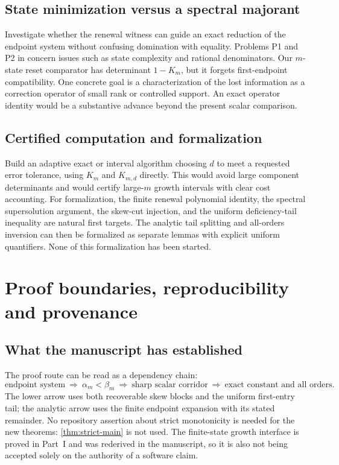 \documentclass[11pt,a4paper]{article}
\theoremstyle{definition}\newaliascnt{definition}{theorem}
\theoremstyle{remark}\newaliascnt{remark}{theorem}
\begin{document}
\subsection{State minimization versus a spectral majorant}
Investigate whether the renewal witness can guide an exact reduction of the
endpoint system without confusing domination with equality. Problems P1 and
P2 in \cite{MayamaAkita} concern issues such as state complexity and
rational denominators. Our $m$-state reset comparator has determinant
$1-K_m$, but it forgets first-endpoint compatibility. One concrete goal is a
characterization of the lost information as a correction operator of small
rank or controlled support. An exact operator identity would be a
substantive advance beyond the present scalar comparison.

\subsection{Certified computation and formalization}
Build an adaptive exact or interval algorithm choosing $d$ to meet a
requested error tolerance, using $K_m$ and $K_{m,d}$ directly. This would
avoid large component determinants and would certify large-$m$ growth
intervals with clear cost accounting. For formalization, the finite renewal
polynomial identity, the spectral supersolution argument, the skew-cut
injection, and the uniform deficiency-tail inequality are natural first
targets. The analytic tail splitting and all-orders inversion can then be
formalized as separate lemmas with explicit uniform quantifiers. None of
this formalization has been started.

\section{Proof boundaries, reproducibility and provenance}
\label{crem:sec:audit}

\subsection{What the manuscript has established}
The proof route can be read as a dependency chain:
\[
 \text{endpoint system}
 \ \Longrightarrow\ \alpha_m<\beta_m
 \ \Longrightarrow\ \text{sharp scalar corridor}
 \ \Longrightarrow\ \text{exact constant and all orders}.
\]
The lower arrow uses both recoverable skew blocks and the uniform
first-entry tail; the analytic arrow uses the finite endpoint expansion with
its stated remainder. No repository assertion about strict monotonicity is
needed for the new theorems: \cref{thm:strict-main} is not used. The
finite-state growth interface is proved in Part~I and was rederived in the
manuscript, so it is also not being accepted solely on the authority of a
software claim.
\end{document}
